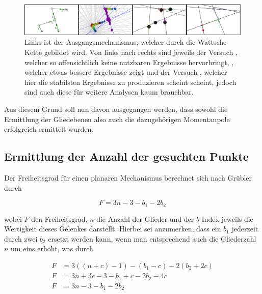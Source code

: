 \begin{figure}
    \includegraphics[width=\textwidth]{gfx/gruppe_failed_edit.png}
    \caption[Versuche ,  und .]{Links ist der Ausgangsmechanismus, welcher durch die Wattsche Kette gebildet wird. Von links nach rechts sind jeweils der Versuch , welcher so offensichtlich keine nutzbaren Ergebnisse hervorbringt, , welcher etwas bessere Ergebnisse zeigt und der Versuch , welcher hier die stabilsten Ergebnisse zu produzieren scheint scheint, jedoch sind auch diese für weitere Analysen kaum brauchbar.}
    \label{fig:gruppe1_3_2_6_3_4}
\end{figure}

Aus diesem Grund soll nun davon ausgegangen werden, dass sowohl die Ermittlung der Gliedebenen also auch die dazugehörigen Momentanpole erfolgreich ermittelt wurden.

\subsection{Ermittlung der Anzahl der gesuchten Punkte}

Der Freiheitsgrad für einen planaren Mechanismus berechnet sich nach Grübler durch

\begin{equation}
    F = 3n - 3 - b_1 - 2b_2
    \label{eq:gruebler}
\end{equation}

wobei $F$ den Freiheitsgrad, $n$ die Anzahl der Glieder und der $b$-Index jeweils die Wertigkeit dieses Gelenkes darstellt.
Hierbei sei anzumerken, dass ein $b_1$ jederzeit durch zwei $b_2$ ersetzt werden kann, wenn man entsprechend auch die Gliederzahl $n$ um eins erhöht, was durch

\begin{equation}
    \begin{split}
        F &= 3((n+c)-1) - (b_1 - c) - 2(b_2 + 2c) \\
        F &= 3n + 3c - 3 - b_1 + c - 2b_2 - 4c \\
        F &= 3n - 3 - b_1 - 2b_2
    \end{split}
\end{equation}

